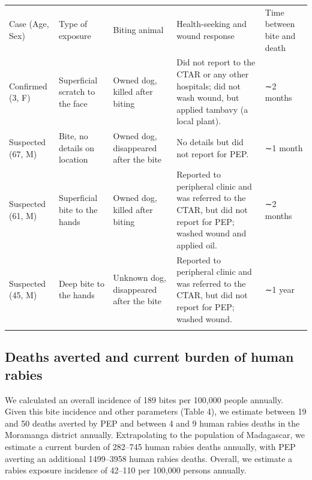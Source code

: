 \documentclass[
]{book}
\begin{document}
\begin{longtable}[]{@{}
  >{\raggedright\arraybackslash}p{}
  >{\raggedright\arraybackslash}p{}
  >{\raggedright\arraybackslash}p{}
  >{\raggedright\arraybackslash}p{}
  >{\raggedright\arraybackslash}p{}@{}}
\toprule
Case (Age, Sex) & Type of exposure & Biting animal & Health-seeking and wound response & Time between bite and death \\ \addlinespace
\midrule
\endhead
Confirmed (3, F) & Superficial scratch to the face & Owned dog, killed after biting & Did not report to the CTAR or any other hospitals; did not wash wound, but applied tambavy (a local plant). & ∼2 months \\ \addlinespace
Suspected (67, M) & Bite, no details on location & Owned dog, disappeared after the bite & No details but did not report for PEP. & ∼1 month \\ \addlinespace
Suspected (61, M) & Superficial bite to the hands & Owned dog, killed after biting & Reported to peripheral clinic and was referred to the CTAR, but did not report for PEP; washed wound and applied oil. & ∼2 months \\ \addlinespace
Suspected (45, M) & Deep bite to the hands & Unknown dog, disappeared after the bite & Reported to peripheral clinic and was referred to the CTAR, but did not report for PEP; washed wound. & ∼1 year \\ \addlinespace
\bottomrule
\end{longtable}

\hypertarget{deaths-averted-and-current-burden-of-human-rabies}{%
\subsection{Deaths averted and current burden of human rabies}\label{deaths-averted-and-current-burden-of-human-rabies}}

We calculated an overall incidence of 189 bites per 100,000 people annually. Given this bite incidence and other parameters (Table 4), we estimate between 19 and 50 deaths averted by PEP and between 4 and 9 human rabies deaths in the Moramanga district annually. Extrapolating to the population of Madagascar, we estimate a current burden of 282--745 human rabies deaths annually, with PEP averting an additional 1499--3958 human rabies deaths. Overall, we estimate a rabies exposure incidence of 42--110 per 100,000 persons annually.
\end{document}
